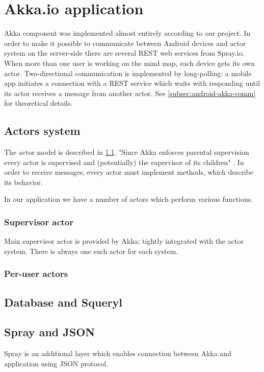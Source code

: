 \section{Akka.io application}
\label{sec:akka-app}
Akka component was implemented almost entirely according to our project. In order to make it possible to communicate between Android devices and actor system on the server-side there are several REST web services from Spray.io. When more than one user is working on the mind map, each device gets its own actor.  Two-directional communication is implemented by long-polling: a mobile app initiates a connection with a REST service which waits with responding until its actor receives a message from another actor. See \cref{subsec:android-akka-comm} for theoretical details.  

\subsection{Actors system }
\label{subsection:akka-actors}
The actor model is described in \cref{subsection:akka-actors}. "Since Akka enforces parental supervision every actor is supervised and (potentially) the supervisor of its children" \cite{AkkaDoc:2013:Actors}. In order to receive messages, every actor must implement  methods, which describe its behavior. 

In our application we have a number of actors which perform various functions.

\subsubsection{Supervisor actor}
\label{subsubsection:akka-actors-supervisor}
Main supervisor actor is provided by Akka; tightly integrated with the actor system. There is always one such actor for each system.
	
\subsubsection{Per-user actors}
\label{subsubsection:akka-actors-peruser}

\subsection{Database and Squeryl}
\label{subsection:akka-database}

\subsection{Spray and JSON}
\label{subsection:akka-spray}
Spray is an additional layer which enables connection between Akka and application using JSON protocol. 


